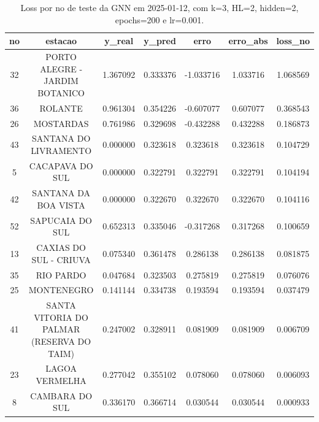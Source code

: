 \begin{table}[h]
\centering
\caption{Loss por no de teste da GNN em 2025-01-12, com k=3, HL=2, hidden=2, epochs=200 e lr=0.001.}
\label{tab:gnn_loss_k3_hl2_h2_e200_d20250112}
\begin{tabular}{ccccccc}
\toprule
no & estacao & y\_real & y\_pred & erro & erro\_abs & loss\_no \\
\midrule
32 & PORTO ALEGRE - JARDIM BOTANICO & 1.367092 & 0.333376 & -1.033716 & 1.033716 & 1.068569 \\
36 & ROLANTE & 0.961304 & 0.354226 & -0.607077 & 0.607077 & 0.368543 \\
26 & MOSTARDAS & 0.761986 & 0.329698 & -0.432288 & 0.432288 & 0.186873 \\
43 & SANTANA DO LIVRAMENTO & 0.000000 & 0.323618 & 0.323618 & 0.323618 & 0.104729 \\
5 & CACAPAVA DO SUL & 0.000000 & 0.322791 & 0.322791 & 0.322791 & 0.104194 \\
42 & SANTANA DA BOA VISTA & 0.000000 & 0.322670 & 0.322670 & 0.322670 & 0.104116 \\
52 & SAPUCAIA DO SUL & 0.652313 & 0.335046 & -0.317268 & 0.317268 & 0.100659 \\
13 & CAXIAS DO SUL - CRIUVA & 0.075340 & 0.361478 & 0.286138 & 0.286138 & 0.081875 \\
35 & RIO PARDO & 0.047684 & 0.323503 & 0.275819 & 0.275819 & 0.076076 \\
25 & MONTENEGRO & 0.141144 & 0.334738 & 0.193594 & 0.193594 & 0.037479 \\
41 & SANTA VITORIA DO PALMAR (RESERVA DO TAIM) & 0.247002 & 0.328911 & 0.081909 & 0.081909 & 0.006709 \\
23 & LAGOA VERMELHA & 0.277042 & 0.355102 & 0.078060 & 0.078060 & 0.006093 \\
8 & CAMBARA DO SUL & 0.336170 & 0.366714 & 0.030544 & 0.030544 & 0.000933 \\
\bottomrule
\end{tabular}
\end{table}
